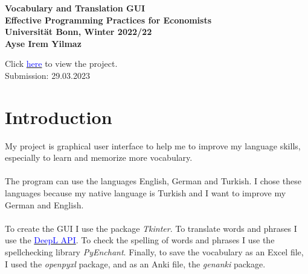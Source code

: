 \documentclass[11pt,a4paper,leqno]{article}
\theoremstyle{definition}
\begin{document}
    \begin{center}
        \begin{large}
            \textbf{
                Vocabulary and Translation GUI\\
                Effective Programming Practices for Economists\\
                Universität Bonn, Winter 2022/22\\[2ex]
                Ayse Irem Yilmaz\\}
        \end{large}
    \end{center}
    
    \begin{center}
        Click \href{https://github.com/irem-y/vocabulary_and_translation_gui}{\textcolor{blue}{here}} to view the project.\\
        Submission: 29.03.2023
    \end{center}
    
    \newpage

    \tableofcontents

    \newpage
    
    \section{Introduction}
    My project is graphical user interface to help me to improve my language skills, especially to learn and memorize more vocabulary.\\\\
    The program can use the languages English, German and Turkish.
    I chose these languages because my native language is Turkish and I want to improve my German and English.\\\\
    To create the GUI I use the package \emph{Tkinter}.
    To translate words and phrases I use the \href{https://github.com/DeepLcom/deepl-python}{\textcolor{blue}{DeepL API}}.
    To check the spelling of words and phrases I use the spellchecking library \emph{PyEnchant}.
    Finally, to save the vocabulary as an Excel file, I used the \emph{openpyxl} package, and as an Anki file, the \emph{genanki} package.
    
    \newpage
    
\end{document}
